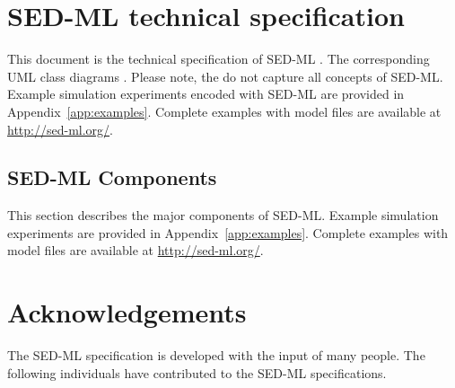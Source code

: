 \documentclass[pdftex,rgb,dvipsnames,svgnames,hyperref,table]{report}
\begin{document}

\sedmltableofcontents
\newpage


\chapter{SED-ML technical specification}
\label{chp:specification}
This document is the technical specification of SED-ML \currentLV. The corresponding UML class diagrams . Please note, the  do not capture all concepts of SED-ML. Example simulation experiments encoded with SED-ML are provided in Appendix~\ref{app:examples}. Complete examples with model files are available at \url{http://sed-ml.org/}.





\pagebreak
\section{SED-ML Components}
\label{sec:components}
This section describes the major components of SED-ML.   Example simulation experiments are provided in Appendix~\ref{app:examples}. Complete examples with model files are available at \url{http://sed-ml.org/}.%












\chapter{Acknowledgements}
\label{chp:acknowledgments}
The SED-ML specification is developed with the input of many people. The following individuals have contributed to the SED-ML specifications.
\end{document}
